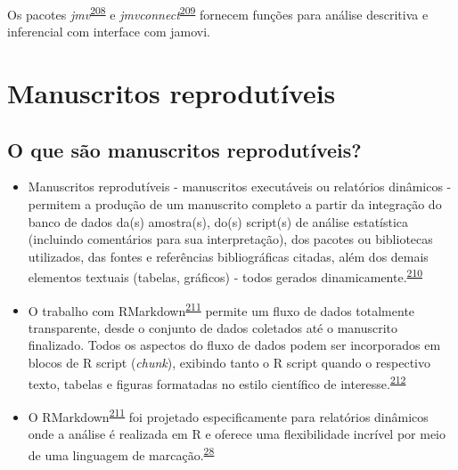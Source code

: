 \documentclass[
  a4paper,
]{book}
\newenvironment{infobox}[1]
  {
  \begin{itemize}
  \renewcommand{\labelitemi}{
    \raisebox{-.7\height}[0pt][0pt]{
      {\setkeys{Gin}{width=3em,keepaspectratio}
        \texttt{[image: \#1]}}
    }
  }
  \setlength{\fboxsep}{1em}
  \begin{blackbox}
  \item
  }
  {
  \end{blackbox}
  \end{itemize}
  }
\begin{document}
\begin{infobox}{images/Rlogo}
Os pacotes \emph{jmv}\textsuperscript{\protect\hyperlink{ref-jmv}{208}} e \emph{jmvconnect}\textsuperscript{\protect\hyperlink{ref-jmvconnect}{209}} fornecem funções para análise descritiva e inferencial com interface com jamovi.

\end{infobox}

\hypertarget{relatuxf3rios-dinamicos}{%
\section{Manuscritos reprodutíveis}\label{relatuxf3rios-dinamicos}}

\hypertarget{o-que-suxe3o-manuscritos-reprodutuxedveis}{%
\subsection{O que são manuscritos reprodutíveis?}\label{o-que-suxe3o-manuscritos-reprodutuxedveis}}

\begin{itemize}
\item
  Manuscritos reprodutíveis - manuscritos executáveis ou relatórios dinâmicos - permitem a produção de um manuscrito completo a partir da integração do banco de dados da(s) amostra(s), do(s) script(s) de análise estatística (incluindo comentários para sua interpretação), dos pacotes ou bibliotecas utilizados, das fontes e referências bibliográficas citadas, além dos demais elementos textuais (tabelas, gráficos) - todos gerados dinamicamente.\textsuperscript{\protect\hyperlink{ref-hinsen2011}{210}}
\item
  O trabalho com RMarkdown\textsuperscript{\protect\hyperlink{ref-R-rmarkdown}{211}} permite um fluxo de dados totalmente transparente, desde o conjunto de dados coletados até o manuscrito finalizado. Todos os aspectos do fluxo de dados podem ser incorporados em blocos de R script (\emph{chunk}), exibindo tanto o R script quando o respectivo texto, tabelas e figuras formatadas no estilo científico de interesse.\textsuperscript{\protect\hyperlink{ref-holmes2021}{212}}
\item
  O RMarkdown\textsuperscript{\protect\hyperlink{ref-R-rmarkdown}{211}} foi projetado especificamente para relatórios dinâmicos onde a análise é realizada em R e oferece uma flexibilidade incrível por meio de uma linguagem de marcação.\textsuperscript{\protect\hyperlink{ref-mair2016}{28}}
\end{itemize}
\end{document}
